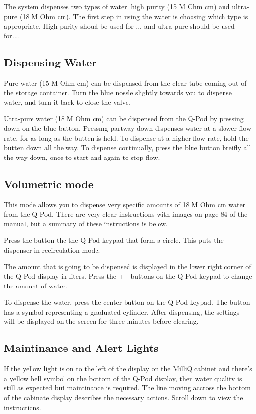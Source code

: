 \documentclass[12pt]{../SOP3_beta}\usepackage[]{graphicx}\usepackage[]{color}
\begin{document}
\NP The system dispenses two types of water: high purity (15 M Ohm cm) and ultra-pure (18 M Ohm cm). The first step in using the water is choosing which type is appropriate. High purity shoud be used for ... and ultra pure should be used for....

\subsection{Dispensing Water}

\NP Pure water (15 M Ohm cm) can be dispensed from the clear tube coming out of the storage container. Turn the blue nossle slightly towards you to dispense water, and turn it back to close the valve. 

\NP Utra-pure water (18 M Ohm cm) can be dispensed from the Q-Pod by pressing down on the blue button. Pressing partway down dispenses water at a slower flow rate, for as long as the butten is held. To dispense at a higher flow rate, hold the butten down all the way. To dispense continually, press the blue button breifly all the way down, once to start and again to stop flow.  

\subsection{Volumetric mode}

\NP This mode allows you to dispense very specific amounts of 18 M Ohm cm water from the Q-Pod. There are very clear instructions with images on page 84 of the manual, but a summary of these instructions is below.

\NP Press the button the the Q-Pod keypad that form a circle. This puts the dispenser in recirculation mode. 

\NP The amount that is going to be dispensed is displayed in the lower right corner of the Q-Pod display in liters. Press the + - buttons on the Q-Pod keypad to change the amount of water. 

\NP To dispense the water, press the center button on the Q-Pod keypad. The button has a symbol representing a graduated cylinder. After dispensing, the settings will be displayed on the screen for three minutes before clearing.

\subsection{Maintinance and Alert Lights}

\NP If the yellow light is on to the left of the display on the MilliQ cabinet and there's a yellow bell symbol on the bottom of the Q-Pod display, then water quality is still as expected but maintinance is required. The line moving accross the bottom of the cabinate display describes the necessary actions. Scroll down to view the instructions. 
\end{document}
